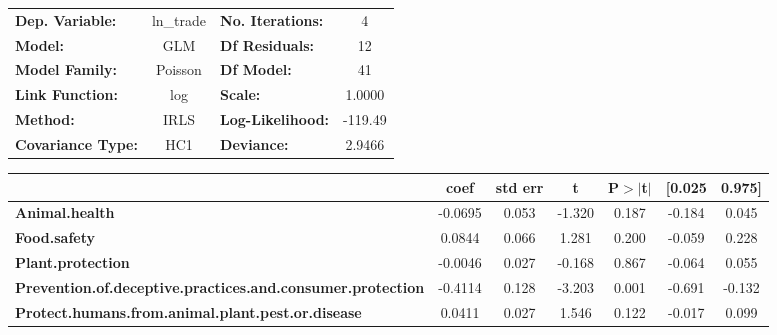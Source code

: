 \begin{center}
\begin{tabular}{lclc}
\toprule
\textbf{Dep. Variable:}                                            &   ln\_trade   & \textbf{  No. Iterations:    } &     4       \\
\textbf{Model:}                                                    &      GLM      & \textbf{  Df Residuals:      } &     12      \\
\textbf{Model Family:}                                             &    Poisson    & \textbf{  Df Model:          } &     41      \\
\textbf{Link Function:}                                            &      log      & \textbf{  Scale:             } &    1.0000   \\
\textbf{Method:}                                                   &      IRLS     & \textbf{  Log-Likelihood:    } &   -119.49   \\
\textbf{Covariance Type:}                                          &      HC1      & \textbf{  Deviance:          } &    2.9466   \\
\bottomrule
\end{tabular}
\begin{tabular}{lcccccc}
                                                                   & \textbf{coef} & \textbf{std err} & \textbf{t} & \textbf{P$> |$t$|$} & \textbf{[0.025} & \textbf{0.975]}  \\
\midrule
\textbf{Animal.health}                                             &      -0.0695  &        0.053     &    -1.320  &         0.187        &       -0.184    &        0.045     \\
\textbf{Food.safety}                                               &       0.0844  &        0.066     &     1.281  &         0.200        &       -0.059    &        0.228     \\
\textbf{Plant.protection}                                          &      -0.0046  &        0.027     &    -0.168  &         0.867        &       -0.064    &        0.055     \\
\textbf{Prevention.of.deceptive.practices.and.consumer.protection} &      -0.4114  &        0.128     &    -3.203  &         0.001        &       -0.691    &       -0.132     \\
\textbf{Protect.humans.from.animal.plant.pest.or.disease}          &       0.0411  &        0.027     &     1.546  &         0.122        &       -0.017    &        0.099     \\

\end{tabular}
\end{center}
